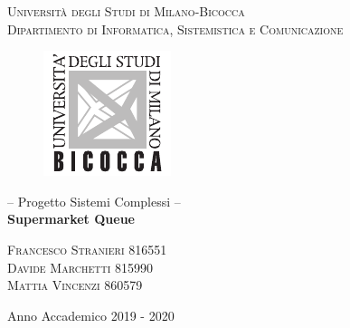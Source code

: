 \begin{titlepage}

\begin{center}
\textsc{Università degli Studi di Milano-Bicocca}\\
\textsc{Dipartimento di Informatica, Sistemistica e Comunicazione}\\
\end{center}
\begin{figure}[h]
\centering
\includegraphics[width=0.3\linewidth]{img/logo_unimib.pdf}
\end{figure}



\begin{center}
\begin{Huge}
\LARGE{-- Progetto Sistemi Complessi --}\\
\textbf{Supermarket Queue}\\

\end{Huge}

\end{center}\par



\par
{}
\begin{flushright}
\textsc{
Francesco Stranieri 816551\\
Davide Marchetti 815990\\
Mattia Vincenzi 860579}\\
\end{flushright}
\centering
Anno Accademico 2019 - 2020\par
\end{titlepage}


\cleardoublepage %